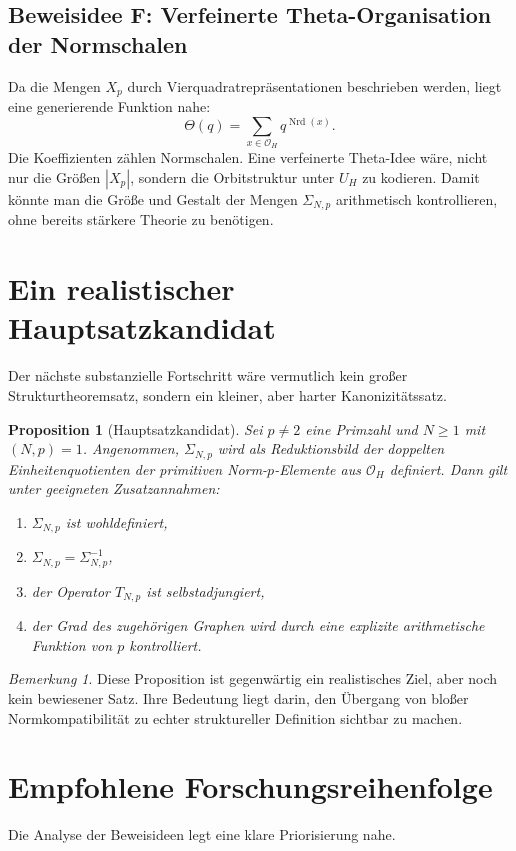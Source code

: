 \documentclass[12pt,a4paper]{article}
\theoremstyle{plain}
\newtheorem{proposition}[satz]{Proposition}
\theoremstyle{definition}
\theoremstyle{remark}
\newtheorem{bemerkung}[satz]{Bemerkung}
\newcommand{\OH}{\mathcal{O}_H}
\newcommand{\Nrd}{\operatorname{Nrd}}
\begin{document}
	\subsection{Beweisidee F: Verfeinerte Theta-Organisation der Normschalen}
	Da die Mengen $X_p$ durch Vierquadratrepräsentationen beschrieben werden, liegt eine generierende Funktion nahe:
	\[
	\Theta(q)=\sum_{x\in \OH} q^{\Nrd(x)}.
	\]
	Die Koeffizienten zählen Normschalen. Eine verfeinerte Theta-Idee wäre, nicht nur die Größen $|X_p|$, sondern die Orbitstruktur unter $U_H$ zu kodieren. Damit könnte man die Größe und Gestalt der Mengen $\Sigma_{N,p}$ arithmetisch kontrollieren, ohne bereits stärkere Theorie zu benötigen.
	
	\section{Ein realistischer Hauptsatzkandidat}
	Der nächste substanzielle Fortschritt wäre vermutlich kein großer Strukturtheoremsatz, sondern ein kleiner, aber harter Kanonizitätssatz.
	
	\begin{proposition}[Hauptsatzkandidat]
		Sei $p\neq 2$ eine Primzahl und $N\ge 1$ mit $(N,p)=1$. Angenommen, $\Sigma_{N,p}$ wird als Reduktionsbild der doppelten Einheitenquotienten der primitiven Norm-$p$-Elemente aus $\OH$ definiert. Dann gilt unter geeigneten Zusatzannahmen:
		\begin{enumerate}[label=(\roman*)]
			\item $\Sigma_{N,p}$ ist wohldefiniert,
			\item $\Sigma_{N,p}=\Sigma_{N,p}^{-1}$,
			\item der Operator $T_{N,p}$ ist selbstadjungiert,
			\item der Grad des zugehörigen Graphen wird durch eine explizite arithmetische Funktion von $p$ kontrolliert.
		\end{enumerate}
	\end{proposition}
	
	\begin{bemerkung}
		Diese Proposition ist gegenwärtig ein realistisches Ziel, aber noch kein bewiesener Satz. Ihre Bedeutung liegt darin, den Übergang von bloßer Normkompatibilität zu echter struktureller Definition sichtbar zu machen.
	\end{bemerkung}
	
	\section{Empfohlene Forschungsreihenfolge}
	Die Analyse der Beweisideen legt eine klare Priorisierung nahe.
	
\end{document}

